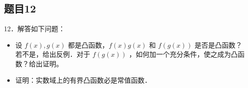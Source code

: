 \documentclass{article}
\begin{document}
\subsection{题目12}
12．解答如下问题：

\begin{itemize}
  \item[（1）] 设 \(f(x), g(x)\) 都是凸函数，\(f(x) g(x)\) 和 \(f(g(x))\) 是否是凸函数？若不是，给出反例．对于 \(f(g(x))\) ，如何加一个充分条件，使之成为凸函数？给出证明。
  \item[（2）] 证明：实数域上的有界凸函数必是常值函数．
\end{itemize}
\end{document}
